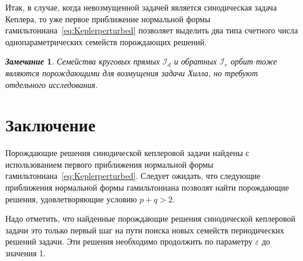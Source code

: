 \documentclass[14pt,a4paper%
]{extarticle}
\newtheorem{remark}{\it Замечание}%
\begin{document}

Итак, в случае, когда невозмущенной задачей является синодическая задача Кеплера, то уже первое приближение нормальной формы гамильтониана~\eqref{eq:Keplerperturbed} позволяет выделить два типа счетного числа однопараметрических семейств порождающих решений.

\begin{remark}
Семейства круговых прямых $\mathcal I_d$ и обратных $\mathcal I_r$ орбит тоже являются порождающими для возмущения задачи Хилла, но требуют отдельного исследования.  
\end{remark}

\section*{Заключение}
Порождающие решения синодической кеплеровой задачи найдены с использованием первого приближения нормальной формы гамильтониана~\eqref{eq:Keplerperturbed}. Следует ожидать, что следующие приближения нормальной формы гамильтониана позволят найти порождающие решения, удовлетворяющие условию $p+q>2$.

Надо отметить, что найденные порождающие решения синодической кеплеровой задачи это только первый шаг на пути поиска новых семейств периодических решений задачи. Эти решения необходимо продолжить по параметру $\varepsilon$ до значения 1.

\renewcommand*{\newblockpunct}{%
    \addperiod\space\bibsentence}%
\hypertarget{bibliolist}{}\printbibliography
\end{document}
